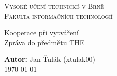 \documentclass[12pt,a4paper,leqno]{article}
\begin{document}
\thispagestyle{empty}
	\begin{center}
	\textsc{\LARGE Vysoké učení technické v Brně}\\[1,5mm]
	\textsc{\Large Fakulta informačních technologií}\\
	\begin{figure}[!ht]
		\centering
	\end{figure}
	\LARGE{Kooperace při vytváření }\\
    \large{Zpráva do předmětu THE}
	\end{center}
	{\Large{\textbf{Autor:}} Jan Ťulák (xtulak00)\vspace{5mm}}\\
	{\hfill \Large \today}\vspace{5mm}
\newpage

\end{document}
